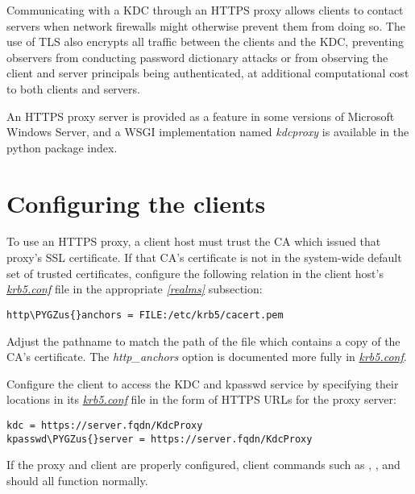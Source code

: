 \documentclass[letterpaper,10pt,english]{sphinxmanual}
\def\PYGZus{\char`\_}
\begin{document}
Communicating with a KDC through an HTTPS proxy allows clients to
contact servers when network firewalls might otherwise prevent them
from doing so.  The use of TLS also encrypts all traffic between the
clients and the KDC, preventing observers from conducting password
dictionary attacks or from observing the client and server principals
being authenticated, at additional computational cost to both clients
and servers.

An HTTPS proxy server is provided as a feature in some versions of
Microsoft Windows Server, and a WSGI implementation named \emph{kdcproxy}
is available in the python package index.


\section{Configuring the clients}
\label{admin/https:configuring-the-clients}
To use an HTTPS proxy, a client host must trust the CA which issued
that proxy's SSL certificate.  If that CA's certificate is not in the
system-wide default set of trusted certificates, configure the
following relation in the client host's {\hyperref[admin/conf_files/krb5_conf:krb5-conf-5]{\emph{krb5.conf}}} file in
the appropriate {\hyperref[admin/conf_files/krb5_conf:realms]{\emph{{[}realms{]}}}} subsection:

\begin{Verbatim}[commandchars=\\\{\}]
http\PYGZus{}anchors = FILE:/etc/krb5/cacert.pem
\end{Verbatim}

Adjust the pathname to match the path of the file which contains a
copy of the CA's certificate.  The \emph{http\_anchors} option is documented
more fully in {\hyperref[admin/conf_files/krb5_conf:krb5-conf-5]{\emph{krb5.conf}}}.

Configure the client to access the KDC and kpasswd service by
specifying their locations in its {\hyperref[admin/conf_files/krb5_conf:krb5-conf-5]{\emph{krb5.conf}}} file in the form
of HTTPS URLs for the proxy server:

\begin{Verbatim}[commandchars=\\\{\}]
kdc = https://server.fqdn/KdcProxy
kpasswd\PYGZus{}server = https://server.fqdn/KdcProxy
\end{Verbatim}

If the proxy and client are properly configured, client commands such
as , , and  should all function normally.
\end{document}
